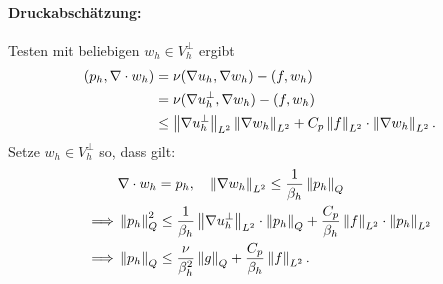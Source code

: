   \paragraph{Druckabschätzung: } Testen mit beliebigen $w_{h} \in
  V_{h}^{\perp}$ ergibt
  \begin{align*}
    (p_{h}, \nabla\cdot w_{h}) &= \nu(\nabla u_{h}, \nabla w_{h})-(f, w_{h})\\
    &=  \nu(\nabla u_{h}^{\perp}, \nabla w_{h})-(f, w_{h})\\
    &\leq \left \|\nabla u_{h}^{\perp} \right\|_{L^{2}} \left \|\nabla
      w_{h} \right\|_{L^{2}} + C_{p} \left \|f \right\|_{L^{2}} \cdot\left \|\nabla
      w_{h} \right\|_{L^{2}}.
  \end{align*}
  Setze $w_{h} \in V_{h}^{\perp}$ so, dass gilt:
  \begin{align*}
    &  \nabla\cdot w_{h} = p_{h}, \quad \left \|\nabla w_{h} \right\|_{L^{2}} \leq \frac 1 {\beta_{h}} \left \|p_{h} \right\|_{Q}\\
    \implies & \left \|p_{h} \right\|^{2}_{Q} \leq \frac 1 {\beta_{h}} \left \|\nabla u_{h}^{\perp} \right\|_{L^{2}} \cdot\left \|p_{h} \right\|_{Q} + \frac {C_{p}}{\beta_{h}} \left \|f \right\|_{L^{2}} \cdot\left \|p_{h} \right\|_{L^{2}}\\
    \implies & \left \|p_{h} \right\|_{Q} \leq \frac \nu {\beta_{h}^{2}}
    \left \|g \right\|_{Q} + \frac {C_{p}}{\beta_{h}} \left \|f \right\|_{L^{2}}.
  \end{align*}


